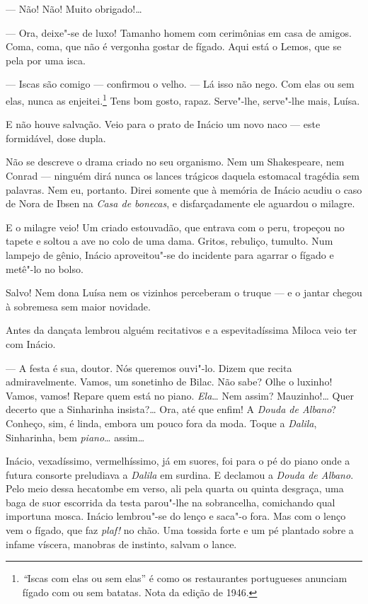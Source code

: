 --- Não! Não! Muito obrigado!\ldots{}

--- Ora, deixe"-se de luxo! Tamanho homem com cerimônias em casa de
amigos. Coma, coma, que não é vergonha gostar de fígado. Aqui está o
Lemos, que se pela por uma isca.

--- Iscas são comigo --- confirmou o velho. --- Lá isso não nego. Com
elas ou sem elas, nunca as enjeitei.\footnote{\emph{``}Iscas com elas ou
  sem elas'' é como os restaurantes portugueses anunciam fígado com ou
  sem batatas. Nota da edição de 1946.} Tens bom gosto, rapaz.
Serve"-lhe, serve"-lhe mais, Luísa.

E não houve salvação. Veio para o prato de Inácio um novo naco --- este
formidável, dose dupla.

Não se descreve o drama criado no seu organismo. Nem um Shakespeare, nem
Conrad --- ninguém dirá nunca os lances trágicos daquela estomacal
tragédia sem palavras. Nem eu, portanto. Direi somente que à memória de
Inácio acudiu o caso de Nora de Ibsen na \emph{Casa de bonecas}, e
disfarçadamente ele aguardou o milagre.

E o milagre veio! Um criado estouvadão, que entrava com o peru, tropeçou
no tapete e soltou a ave no colo de uma dama. Gritos, rebuliço, tumulto.
Num lampejo de gênio, Inácio aproveitou"-se do incidente para agarrar o
fígado e metê"-lo no bolso.

Salvo! Nem dona Luísa nem os vizinhos perceberam o truque --- e o jantar
chegou à sobremesa sem maior novidade.

Antes da dançata lembrou alguém recitativos e a espevitadíssima Miloca
veio ter com Inácio.

--- A festa é sua, doutor. Nós queremos ouvi"-lo. Dizem que recita
admiravelmente. Vamos, um sonetinho de Bilac. Não sabe? Olhe o luxinho!
Vamos, vamos! Repare quem está no piano. \emph{Ela}\ldots{} Nem assim?
Mauzinho!\ldots{} Quer decerto que a Sinharinha insista?\ldots{} Ora, até que
enfim! A \emph{Douda de Albano}? Conheço, sim, é linda, embora um pouco
fora da moda. Toque a \emph{Dalila}, Sinharinha, bem \emph{piano}\ldots{}
assim\ldots{}

Inácio, vexadíssimo, vermelhíssimo, já em suores, foi para o pé do piano
onde a futura consorte preludiava a \emph{Dalila} em surdina. E declamou
a \emph{Douda de Albano}. Pelo meio dessa hecatombe em verso, ali pela
quarta ou quinta desgraça, uma baga de suor escorrida da testa parou"-lhe
na sobrancelha, comichando qual importuna mosca. Inácio lembrou"-se do
lenço e saca"-o fora. Mas com o lenço vem o fígado, que faz \emph{plaf!}
no chão. Uma tossida forte e um pé plantado sobre a infame víscera,
manobras de instinto, salvam o lance.

